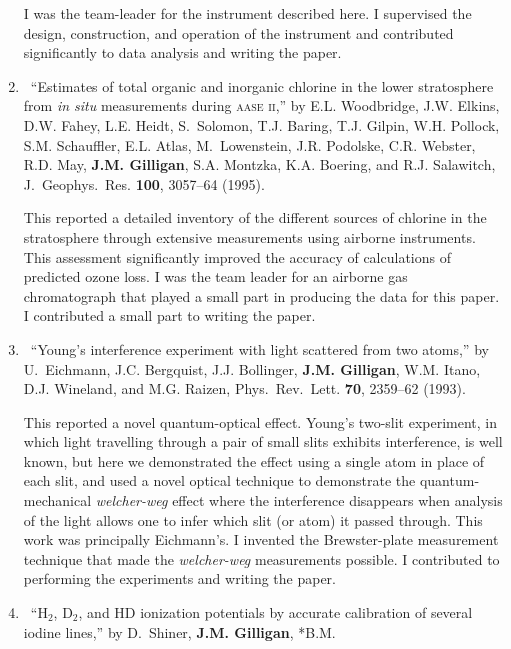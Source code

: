 \begin{enumerate}
\begin{credit}
	  I was the team-leader for the instrument described here. I supervised the design, construction, and operation of the instrument and contributed significantly to data analysis and writing the paper.
	  \end{credit}
%	
	\item
	\textdagger\ 
	\enquote{Estimates of total organic and inorganic chlorine in the lower
	  stratosphere from \emph{in situ\/} measurements during \textsc{aase ii},}  by
	  E.L. Woodbridge, J.W. Elkins, D.W. Fahey, L.E. Heidt, S.~Solomon, T.J.
	  Baring, T.J. Gilpin, W.H. Pollock, S.M. Schauffler, E.L. Atlas,
	  M.~Lowenstein, J.R. Podolske, C.R. Webster, R.D. May, \textbf{J.M. Gilligan},
	  S.A. Montzka, K.A. Boering, and R.J. Salawitch, J.\ Geophys.\ Res.
	  \textbf{100}, 3057--64 (1995). 
	  \begin{credit}
	  This reported a detailed inventory of the different sources of chlorine in the stratosphere through extensive measurements using airborne instruments. This assessment significantly improved the accuracy of calculations of predicted ozone loss.
	  I was the team leader for an airborne gas chromatograph that played a small part in producing the data for this paper. I contributed a small part to writing the paper.
	  \end{credit}
%	
	\item
	\textdagger\ 
	\enquote{Young's interference experiment with light scattered from two atoms,}
	  by U.~Eichmann, J.C. Bergquist, J.J. Bollinger, \textbf{J.M. Gilligan}, W.M.
	  Itano, D.J. Wineland, and M.G. Raizen, Phys.\ Rev.\ Lett. \textbf{70},
	  2359--62 (1993). 
	  \begin{credit}
	  This reported a novel quantum-optical effect. Young's two-slit experiment, in which light travelling through a pair of small slits exhibits interference, is well known, but here we demonstrated the effect using a single atom in place of each slit, and used a novel optical technique to demonstrate the quantum-mechanical \emph{welcher-weg} effect where the interference disappears when analysis of the light allows one to infer which slit (or atom) it passed through.
	  This work was principally Eichmann's. I invented the Brewster-plate measurement technique that made the \emph{welcher-weg} measurements possible. I contributed to performing the experiments and writing the paper.
	  \end{credit}
%	
	\item
	\textdagger\ 
	\enquote{{H$_2$}, {D$_2$}, and {HD} ionization potentials by accurate
	  calibration of several iodine lines,}  by D.~Shiner, \textbf{J.M. Gilligan}, *B.M.

\end{enumerate}
